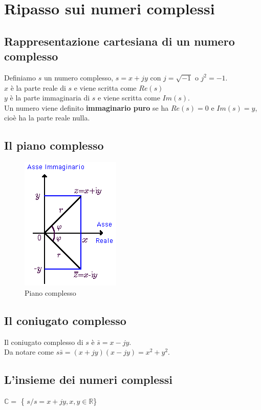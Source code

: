 \appendix

\chapter{Ripasso sui numeri complessi}

\section{Rappresentazione cartesiana di un numero complesso}
Definiamo $s$ un numero complesso, $ s = x+jy$ con $j=\sqrt{-1}$ o $j^{2} = -1$.\\
$x$ è la parte reale di $s$ e viene scritta come $Re(s)$ \\
$y$ è la parte immaginaria di $s$ e viene scritta come $Im(s)$.\\
Un numero viene definito \textbf{ immaginario puro} se ha $ Re(s) = 0 $ e $ Im(s) = y $, cioè ha la parte reale nulla.

\section{Il piano complesso}

\begin{figure}[h]
	\centering
	\includegraphics[scale=1.2]{immagini/pianoComplesso}
	\caption{ Piano complesso }
	\label{fig: piano complesso}
\end{figure}

\section{Il coniugato complesso}
Il coniugato complesso di $s$ è $ \bar{s} = x -jy $.\\
Da notare come $s\bar{s} = (x+jy)(x-jy) = x^{2}+y^{2}$.\\

\section{L'insieme dei numeri complessi}
$\mathbb{C} =$ \{ $s / s = x+jy, x,y \in \mathbb{R} $\} 

